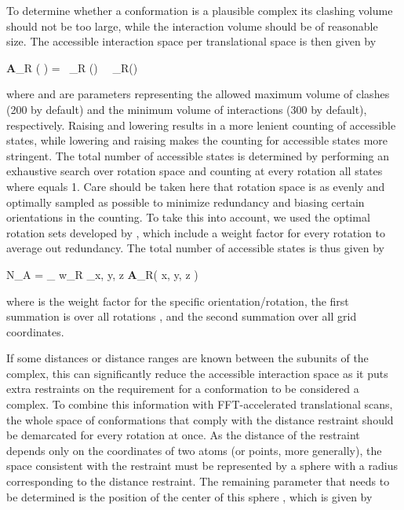 To determine whether a conformation is a plausible complex its clashing volume
should not be too large, while the interaction volume should be of reasonable
size. The accessible interaction space per translational space is then given by

\startformula
{\bf A}_R \left( \rvec \right) = \startmathcases
{} \MC {}\ \boldC_R \left(\rvec \right) \leq \Cmax\ \ \boldI_R\left(\rvec \right) \geq \Imin \NR
\NC \NC \NR
{} \MC {} \NR
\stopmathcases
\stopformula

where \m{\Cmax} and \m{\Imin} are parameters representing the allowed maximum
volume of clashes (200\Angstrom{} by default) and the minimum volume of
interactions (300\Angstrom{} by default), respectively. Raising \m{\Cmax}
and lowering \m{\Imin} results in a more lenient counting of accessible states,
while lowering \m{\Cmax} and raising \m{\Imin} makes the counting for
accessible states more stringent. The total number of accessible states is
determined by performing an exhaustive search over rotation space and counting
at every rotation all states where  equals 1.  Care should be
taken here that rotation space is as evenly and optimally sampled as possible
to minimize redundancy and biasing certain orientations in the counting. To
take this into account, we used the optimal rotation sets developed by
\citeauthor{Karney2007}, which include a weight factor for every rotation
to average out redundancy. The total number of accessible states  is
thus given by

\startformula
N_A = \sum_{\boldP} w_R \sum_{x, y, z} {\bf A}_R\left( x, y, z \right)
\stopformula

where  is the weight factor for the specific orientation/rotation, the first
summation is over all rotations \m{\boldP}, and the second summation over all grid
coordinates.



If some distances or distance ranges are known between the subunits of the
complex, this can significantly reduce the accessible interaction space as it
puts extra restraints on the requirement for a conformation to be considered a
complex. To combine this information with FFT-accelerated translational scans,
the whole space of conformations that comply with the distance restraint should
be demarcated for every rotation at once. As the distance of the restraint
depends only on the coordinates of two atoms (or points, more generally), the
space consistent with the restraint must be represented by a sphere with a
radius corresponding to the distance restraint. The remaining parameter that
needs to be determined is the position of the center of this sphere
, which is given by


